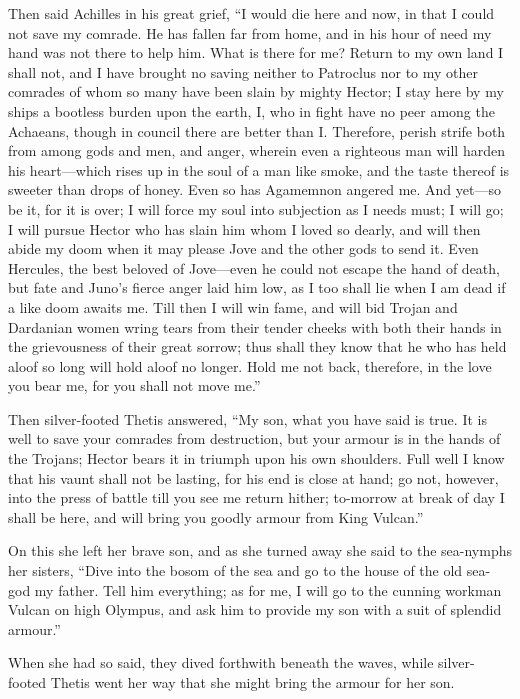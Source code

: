 Then said Achilles in his great grief, “I would die here and now, in that
I could not save my comrade. He has fallen far from home, and in his hour
of need my hand was not there to help him. What is there for me? Return to
my own land I shall not, and I have brought no saving neither to Patroclus
nor to my other comrades of whom so many have been slain by mighty Hector;
I stay here by my ships a bootless burden upon the earth, I, who in fight
have no peer among the Achaeans, though in council there are better than
I. Therefore, perish strife both from among gods and men, and anger,
wherein even a righteous man will harden his heart—which rises up in
the soul of a man like smoke, and the taste thereof is sweeter than drops
of honey. Even so has Agamemnon angered me. And yet—so be it, for it
is over; I will force my soul into subjection as I needs must; I will go;
I will pursue Hector who has slain him whom I loved so dearly, and will
then abide my doom when it may please Jove and the other gods to send it.
Even Hercules, the best beloved of Jove—even he could not escape the
hand of death, but fate and Juno’s fierce anger laid him low, as I too
shall lie when I am dead if a like doom awaits me. Till then I will win
fame, and will bid Trojan and Dardanian women wring tears from their
tender cheeks with both their hands in the grievousness of their great
sorrow; thus shall they know that he who has held aloof so long will hold
aloof no longer. Hold me not back, therefore, in the love you bear me, for
you shall not move me.”

Then silver-footed Thetis answered, “My son, what you have said is true.
It is well to save your comrades from destruction, but your armour is in
the hands of the Trojans; Hector bears it in triumph upon his own
shoulders. Full well I know that his vaunt shall not be lasting, for his
end is close at hand; go not, however, into the press of battle till you
see me return hither; to-morrow at break of day I shall be here, and will
bring you goodly armour from King Vulcan.”

On this she left her brave son, and as she turned away she said to the
sea-nymphs her sisters, “Dive into the bosom of the sea and go to the
house of the old sea-god my father. Tell him everything; as for me, I will
go to the cunning workman Vulcan on high Olympus, and ask him to provide
my son with a suit of splendid armour.”

When she had so said, they dived forthwith beneath the waves, while
silver-footed Thetis went her way that she might bring the armour for her
son.

